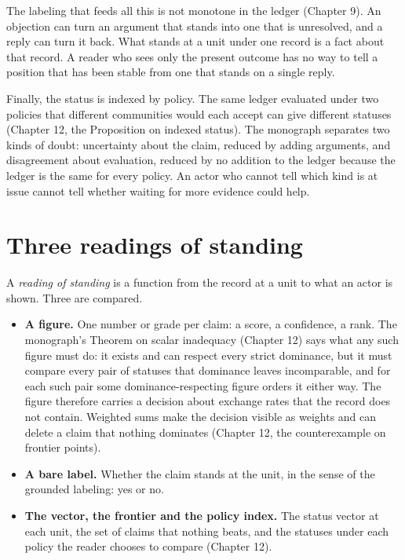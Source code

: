 \documentclass[11pt]{article}
\begin{document}
The labeling that feeds all this is not monotone in the ledger (Chapter 9). An objection can turn an argument that stands into one that is unresolved, and a reply can turn it back. What stands at a unit under one record is a fact about that record. A reader who sees only the present outcome has no way to tell a position that has been stable from one that stands on a single reply.

Finally, the status is indexed by policy. The same ledger evaluated under two policies that different communities would each accept can give different statuses (Chapter 12, the Proposition on indexed status). The monograph separates two kinds of doubt: uncertainty about the claim, reduced by adding arguments, and disagreement about evaluation, reduced by no addition to the ledger because the ledger is the same for every policy. An actor who cannot tell which kind is at issue cannot tell whether waiting for more evidence could help.

\section{Three readings of standing}\label{sec:readings}

A \emph{reading of standing} is a function from the record at a unit to what an actor is shown. Three are compared.

\begin{itemize}[nosep]
\item \textbf{A figure.} One number or grade per claim: a score, a confidence, a rank. The monograph's Theorem on scalar inadequacy (Chapter 12) says what any such figure must do: it exists and can respect every strict dominance, but it must compare every pair of statuses that dominance leaves incomparable, and for each such pair some dominance-respecting figure orders it either way. The figure therefore carries a decision about exchange rates that the record does not contain. Weighted sums make the decision visible as weights and can delete a claim that nothing dominates (Chapter 12, the counterexample on frontier points).
\item \textbf{A bare label.} Whether the claim stands at the unit, in the sense of the grounded labeling: yes or no.
\item \textbf{The vector, the frontier and the policy index.} The status vector at each unit, the set of claims that nothing beats, and the statuses under each policy the reader chooses to compare (Chapter 12).
\end{itemize}
\end{document}
